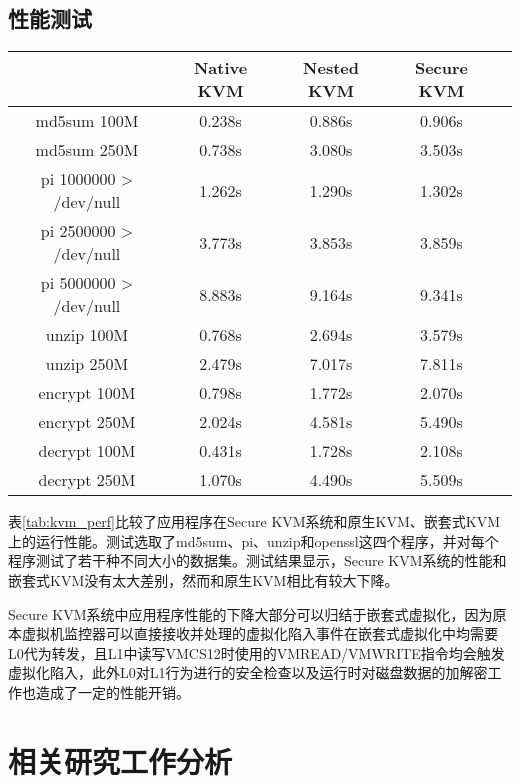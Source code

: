 \subsection{性能测试}

\begin{table}[!htbp]
  \centering
    \begin{tabular}{ccccc}
    \toprule
          & Native KVM & Nested KVM & Secure KVM \\
    \midrule
    md5sum 100M & 0.238s & 0.886s & 0.906s \\
    md5sum 250M & 0.738s & 3.080s & 3.503s \\
    pi 1000000 > /dev/null & 1.262s & 1.290s & 1.302s \\
    pi 2500000 > /dev/null & 3.773s & 3.853s & 3.859s \\
    pi 5000000 > /dev/null & 8.883s & 9.164s & 9.341s \\
    unzip 100M & 0.768s & 2.694s & 3.579s \\
    unzip 250M & 2.479s & 7.017s & 7.811s \\
    encrypt 100M & 0.798s & 1.772s & 2.070s \\
    encrypt 250M & 2.024s & 4.581s & 5.490s \\
    decrypt 100M & 0.431s & 1.728s & 2.108s \\
    decrypt 250M & 1.070s & 4.490s & 5.509s \\
    \bottomrule
    \end{tabular}%
\end{table}%

表\ref{tab:kvm_perf}比较了应用程序在Secure KVM系统和原生KVM、嵌套式KVM上的运行性能。测试选取了md5sum、pi、unzip和openssl这四个程序，并对每个程序测试了若干种不同大小的数据集。测试结果显示，Secure KVM系统的性能和嵌套式KVM没有太大差别，然而和原生KVM相比有较大下降。

Secure KVM系统中应用程序性能的下降大部分可以归结于嵌套式虚拟化，因为原本虚拟机监控器可以直接接收并处理的虚拟化陷入事件在嵌套式虚拟化中均需要L0代为转发，且L1中读写VMCS12时使用的VMREAD/VMWRITE指令均会触发虚拟化陷入，此外L0对L1行为进行的安全检查以及运行时对磁盘数据的加解密工作也造成了一定的性能开销。


\section{相关研究工作分析}

